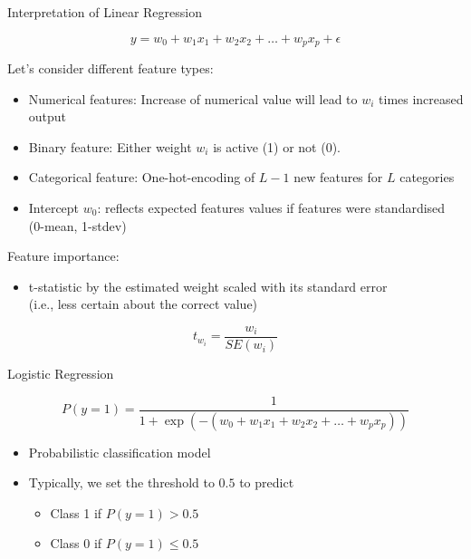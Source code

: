 \documentclass[11pt,compress,t,notes=noshow, xcolor=table]{beamer}
\begin{document}

\begin{vbframe}{Interpretation of Linear Regression}

    $$y = w_0 + w_1 x_1 + w_2 x_2 + \ldots + w_p x_p + \epsilon $$

    Let's consider different feature types:
    \begin{itemize}
        \item Numerical features: Increase of numerical value will lead to $w_i$ times increased output
        \item Binary feature: Either weight $w_i$ is active (1) or not (0).
        \item Categorical feature: One-hot-encoding of $L-1$ new features for $L$ categories
        \item Intercept $w_0$: reflects expected features values if features were standardised (0-mean, 1-stdev)
    \end{itemize}	
    
    Feature importance:
    \begin{itemize}
        \item t-statistic by the estimated weight scaled with its standard error\\ (i.e., less certain about the correct value)
    \end{itemize}
    $$t_{w_i} = \frac{w_i}{SE(w_i)} $$
\end{vbframe}

	
\begin{vbframe}{Logistic Regression}

    $$P(y = 1) =\frac{1}{1 + \exp(-( w_0 + w_1 x_1 + w_2 x_2 + \ldots + w_p x_p ))} $$

    \begin{itemize}
        \item Probabilistic \alert{classification} model 
        \item Typically, we set the threshold to $0.5$ to predict 
        \begin{itemize}
            \item Class 1 if $P(y=1) > 0.5$
            \item Class 0 if $P(y=1) \leq 0.5$
        \end{itemize}
    \end{itemize}	

\end{vbframe}
\end{document}

